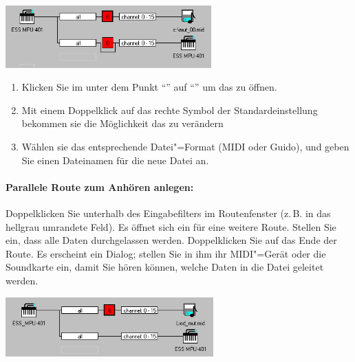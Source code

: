 \begin{center}
\ifhtml
{}
\else
\includegraphics[width=224.5pt]{cc_midiout}
\fi
\end{center}

\begin{enumerate}
\item Klicken Sie im  unter dem Punkt
  "`"' auf
  "`"' um das
   zu öffnen.
\item Mit einem Doppelklick auf das rechte Symbol der
  Standardeinstellung bekommen sie die Möglichkeit das
   zu verändern
\item Wählen sie das entsprechende Datei"=Format (MIDI oder Guido),
  und geben Sie einen Dateinamen für die neue Datei an.
\end{enumerate}


\paragraph{Parallele Route zum Anhören anlegen:} Doppelklicken Sie 
unterhalb des Eingabefilters im Routenfenster (z.\,B. in das hellgrau 
umrandete Feld). Es öffnet sich ein  
für eine weitere Route. Stellen Sie ein, dass alle Daten durchgelassen 
werden. Doppelklicken Sie auf das Ende der Route. Es erscheint 
ein  Dialog; stellen Sie in ihm 
ihr MIDI"=Gerät oder die Soundkarte ein, damit Sie hören können, 
welche Daten in die Datei geleitet werden.

\begin{center}
\ifhtml
{}
\else
\includegraphics[width=226.5pt]{cc_midioutpara}
\fi
\end{center}



